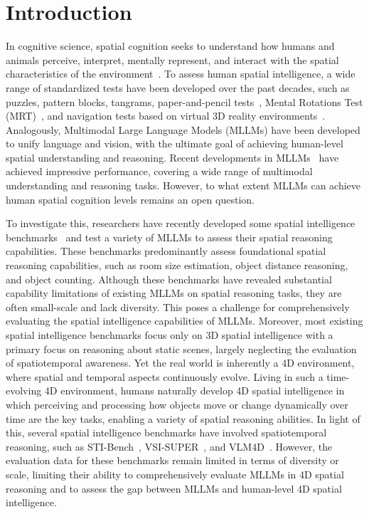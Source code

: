 \section{Introduction}
\label{sec:intro}



In cognitive science, spatial cognition seeks to understand how humans and animals perceive, interpret, mentally represent, and interact with the spatial characteristics of the environment~\cite{waller2013handbook, newcombe2004spatial}.
To assess human spatial intelligence, a wide range of standardized tests have been developed over the past decades, such as puzzles, pattern blocks, tangrams, paper-and-pencil tests~\cite{carroll1993human,eliot1983international,hegarty2005individual}, Mental Rotations Test (MRT)~\cite{peters1995redrawn}, and navigation tests based on virtual 3D reality environments~\cite{wolbers2008spatial}.
Analogously, Multimodal Large Language Models (MLLMs) have been developed to unify language and vision, with the ultimate goal of achieving human-level spatial understanding and reasoning.
Recent developments in MLLMs~\cite{OpenAI2025,Gemini2025,zhang2025videollama,bai2025qwen2,wang2025internvl3} have achieved impressive performance, covering a wide range of multimodal understanding and reasoning tasks.
However, to what extent MLLMs can achieve human spatial cognition levels remains an open question.


To investigate this, researchers have recently developed some spatial intelligence benchmarks~\cite{Yang_2025_CVPR,yu2025far,liu2025mirage,gong2025space,deng2025internspatial,yang2025mmsi,ma20243dsrbench,cheng2024spatialrgpt,zhao2025mmvu,tang2025lego} and test a variety of MLLMs to assess their spatial reasoning capabilities.
These benchmarks predominantly assess foundational spatial reasoning capabilities, such as room size estimation, object distance reasoning, and object counting.
Although these benchmarks have revealed substantial capability limitations of existing MLLMs on spatial reasoning tasks, they are often small-scale and lack diversity.
This poses a challenge for comprehensively evaluating the spatial intelligence capabilities of MLLMs.
Moreover, most existing spatial intelligence benchmarks focus only on 3D spatial intelligence with a primary focus on reasoning about static scenes, largely neglecting the evaluation of spatiotemporal awareness.
Yet the real world is inherently a 4D environment, where spatial and temporal aspects continuously evolve.
Living in such a time-evolving 4D environment, humans naturally develop 4D spatial intelligence in which perceiving and processing how objects move or change dynamically over time are the key tasks, enabling a variety of spatial reasoning abilities.
In light of this, several spatial intelligence benchmarks have involved spatiotemporal reasoning, such as STI-Bench~\cite{li2025sti}, VSI-SUPER~\cite{yang2025cambrian}, and VLM4D~\cite{zhou2025vlm4d}.
However, the evaluation data for these benchmarks remain limited in terms of diversity or scale, limiting their ability to comprehensively evaluate MLLMs in 4D spatial reasoning and to assess the gap between MLLMs and human-level 4D spatial intelligence.



